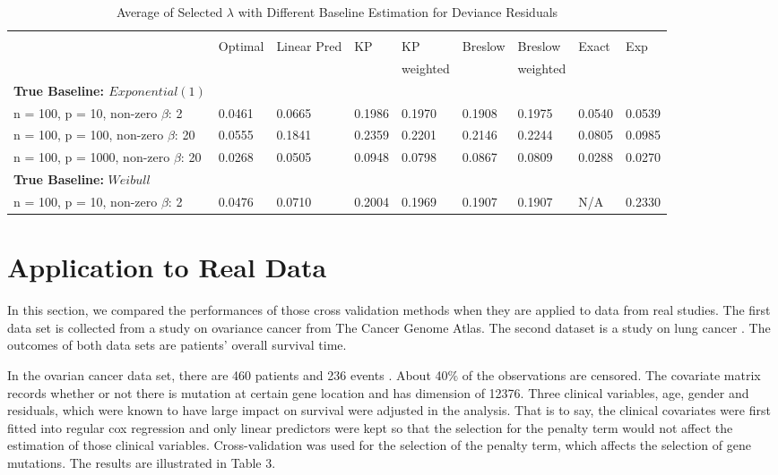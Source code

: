 \begin{table}[h]
	\small
	\caption{Average of Selected $\lambda$ with Different Baseline Estimation for Deviance Residuals}
	\centering
	\begin{tabular}{lllllllll}
	\hline
	\\[-0.75em]
    & Optimal & Linear Pred & KP & KP & Breslow & Breslow & Exact & Exp\\ 
    &  & & & weighted & & weighted & & \\ \cline{2 - 9} 
\textbf{True Baseline: $Exponential(1)$} &&&&&&&&\\
n = 100, p = 10, non-zero $\beta$: 2 & 0.0461 & 0.0665 & 0.1986 & 0.1970 & 0.1908 & 0.1975 & 0.0540 & 0.0539 \\
n = 100, p = 100, non-zero $\beta$: 20 &0.0555 & 0.1841 & 0.2359 & 0.2201 & 0.2146 & 0.2244 & 0.0805 & 0.0985 \\
n = 100, p = 1000, non-zero $\beta$: 20 & 0.0268 & 0.0505 & 0.0948 & 0.0798 & 0.0867 & 0.0809 & 0.0288 & 0.0270 \\
\textbf{True Baseline:} $Weibull$ &&&&&&&& \\
 n = 100, p = 10, non-zero $\beta$: 2 & 0.0476 & 0.0710 & 0.2004 & 0.1969 & 0.1907 & 0.1907 & N/A & 0.2330 \\ 
\hline
\end{tabular}
\end{table}

\section{Application to Real Data}

\par In this section, we compared the performances of those cross validation methods when they are applied to data from real studies. The first data set is collected from a study on ovariance cancer from The Cancer Genome Atlas. The second dataset is a study on lung cancer \citep{shedden2008gene}. The outcomes of both data sets are patients' overall survival time.

\par In the ovarian cancer data set, there are 460 patients and 236 events . About 40$\%$ of the observations are censored. The covariate matrix records whether or not there is mutation at certain gene location and has dimension of 12376. Three clinical variables, age, gender and residuals, which were known to have large impact on survival were adjusted in the analysis. That is to say, the clinical covariates were first fitted into regular cox regression and only linear predictors were kept so that the selection for the penalty term would not affect the estimation of those clinical variables. Cross-validation was used for the selection of the penalty term, which affects the selection of gene mutations. The results are illustrated in Table 3. 

